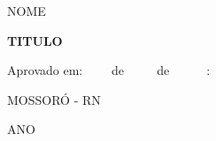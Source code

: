 

 \begin{center}
    {NOME}

    \vspace*{\fill}\vspace*{\fill}
    \begin{center}
      { \textbf{TITULO}}
    \end{center}
    \vspace*{\fill}
    
    \begin{minipage}{.5\textwidth}
    \end{minipage}%
    \vspace*{\fill}
   \end{center}
        
   \noindent Aprovado em:$ \qquad $ de $ \qquad $ de$ \qquad \quad $:
\begin{center}

  
  \vspace{1cm}
  
  \vspace{1cm}
  

\end{center}

   
  \vspace{1cm}    
   \begin{center}
    \vspace*{0.5cm}
    {\normalsize MOSSORÓ - RN}
    \par
    {\normalsize ANO}
    \vspace*{1cm}
  \end{center}


	

  
